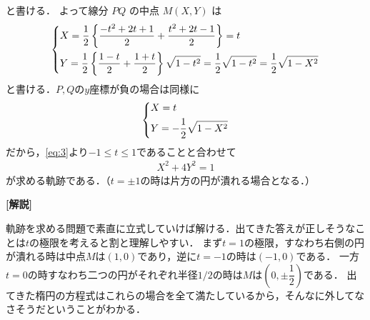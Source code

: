 \documentclass[../../main.tex]{subfiles}
\begin{document}
と書ける．
よって線分 $PQ$ の中点 $M(X,Y)$ は
\begin{align}
  \begin{dcases}
    X = \dfrac{1}{2}\left\{\dfrac{-t^2+2t+1}{2} + \dfrac{t^2+2t-1}{2}\right\} = t \\
    Y = \dfrac{1}{2}\left\{\dfrac{1-t}{2} + \dfrac{1+t}{2}\right\}\sqrt{1-t^2} = \dfrac{1}{2}\sqrt{1-t^2} = \dfrac{1}{2}\sqrt{1-X^2}
  \end{dcases}
\end{align}
と書ける．$P, Q$の$y$座標が負の場合は同様に
\begin{align}
  \begin{dcases}
    X = t \\
    Y = -\dfrac{1}{2}\sqrt{1-X^2}
  \end{dcases}
\end{align}
だから，\cref{eq:3}より$-1\le t\le 1$であることと合わせて
\begin{align}
  X^2 + 4Y^2 = 1
\end{align}
が求める軌跡である．（$t=\pm 1$の時は片方の円が潰れる場合となる．）

{\bf [解説]}

軌跡を求める問題で素直に立式していけば解ける．出てきた答えが正しそうなことは$t$の極限を考えると割と理解しやすい．
まず$t=1$の極限，すなわち右側の円が潰れる時は中点$M$は$(1,0)$であり，逆に$t=-1$の時は$(-1,0)$である．
一方$t=0$の時すなわち二つの円がそれぞれ半径$1/2$の時は$M$は$\left(0,\pm \dfrac{1}{2}\right)$である．
出てきた楕円の方程式はこれらの場合を全て満たしているから，そんなに外してなさそうだということがわかる．
\end{document}

